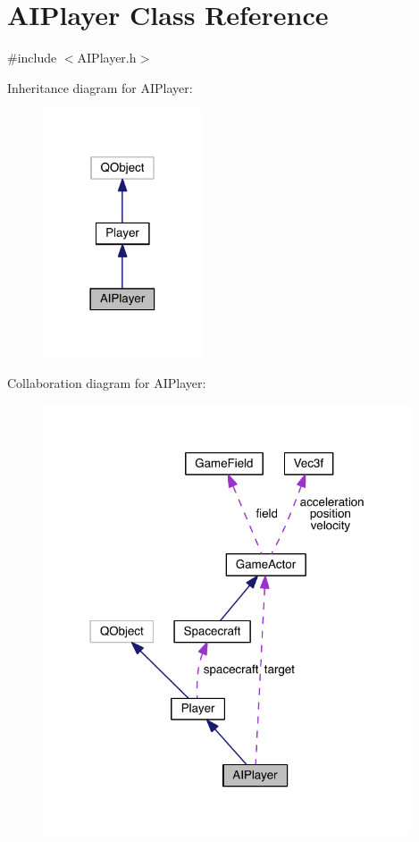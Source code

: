 \hypertarget{class_a_i_player}{\section{A\+I\+Player Class Reference}
\label{class_a_i_player}
}


{\ttfamily \#include $<$A\+I\+Player.\+h$>$}



Inheritance diagram for A\+I\+Player\+:\nopagebreak
\begin{figure}[H]
\begin{center}
\leavevmode
\includegraphics[width=134pt]{class_a_i_player__inherit__graph}
\end{center}
\end{figure}


Collaboration diagram for A\+I\+Player\+:\nopagebreak
\begin{figure}[H]
\begin{center}
\leavevmode
\includegraphics[width=310pt]{class_a_i_player__coll__graph}
\end{center}
\end{figure}

